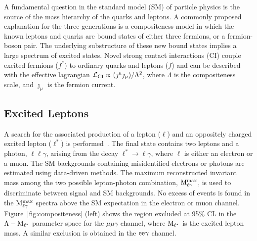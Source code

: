 \documentclass[11pt]{article}
\begin{document}
A fundamental question in the standard model (SM) of particle physics is the source of the 
mass hierarchy of the quarks and leptons. A commonly proposed explanation for the three 
generations is a compositeness model in which the known leptons and quarks are bound states 
of either three fermions, or a fermion-boson pair. The underlying substructure of these new 
bound states implies a large spectrum of excited states. Novel strong contact interactions (CI) 
couple excited fermions ($f^\ast$) to ordinary quarks and leptons ($f$) and can be described 
with the effective lagrangian $\mathcal{L}_{\rm{CI}} \propto (\jmath^\mu \jmath_\mu) / \Lambda^{2} $, 
where $\Lambda$ is the compositeness scale, and $\jmath_\mu$ is the fermion current. 

\subsection{Excited Leptons}
A search for the associated production of a lepton ($\ell$) and an oppositely 
charged excited lepton ($\ell^{\ast}$) is performed~\cite{CMSPAPER:EXO-10-016}. 
The final state contains two leptons and a photon, $\ell\ell\gamma$, arising 
from the decay $\ell^{\ast} \rightarrow \ell \gamma$, where $\ell$ is either an electron or a muon.
The SM backgrounds containing misidentified electrons or photons are estimated using 
data-driven methods. The maximum reconstructed invariant mass among the 
two possible lepton-photon combination, $\rm{M}^{max}_{\ell\gamma}$,
is used to discriminate between signal and SM backgrounds.
No excess of events is found in the $\rm{M}^{max}_{\ell\gamma}$ spectra 
above the SM expectation in the electron or muon channel. Figure~\ref{fig:compositeness} (left) 
shows the region excluded at 95\% CL in the $\Lambda - \rm{M}_{\ell^\ast}$ parameter space for 
the $\mu\mu\gamma$ channel, where $\rm{M}_{\ell^\ast}$ is the excited lepton mass.
A similar exclusion is obtained in the $\rm{ee}\gamma$ channel.
\end{document}
